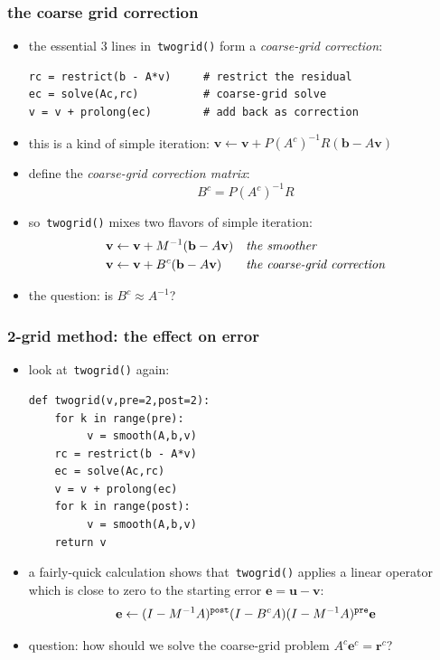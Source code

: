 \documentclass[10pt,
               svgnames,
               hyperref={colorlinks,citecolor=DeepPink4,linkcolor=FireBrick,urlcolor=Maroon},
               usepdftitle=false]{beamer}
\newcommand{\bb}{\mathbf{b}}
\newcommand{\be}{\mathbf{e}}
\newcommand{\br}{\mathbf{r}}
\newcommand{\bu}{\mathbf{u}}
\newcommand{\bv}{\mathbf{v}}
\begin{document}
\begin{frame}[fragile]
\frametitle{the coarse grid correction}
\begin{itemize}
\item the essential 3 lines in \,\texttt{twogrid()} form a \emph{coarse-grid correction}:

\medskip
\begin{verbatim}
rc = restrict(b - A*v)     # restrict the residual
ec = solve(Ac,rc)          # coarse-grid solve
v = v + prolong(ec)        # add back as correction
\end{verbatim}

\smallskip
\item this is a kind of simple iteration: \qquad $\bv \leftarrow \bv + P (A^c)^{-1} R (\bb - A\bv)$
\item define the \emph{coarse-grid correction matrix}:
	$$B^c = P (A^c)^{-1} R$$
\item so \,\texttt{twogrid()} mixes two flavors of simple iteration:
\begin{align*}
\bv &\leftarrow \bv + M^{-1} (\bb - A\bv) &&\text{\emph{the smoother}} \\
\bv &\leftarrow \bv + B^c (\bb - A\bv) &&\text{\emph{the coarse-grid correction}}
\end{align*}

\medskip
\item the question: is $B^c \approx A^{-1}$?  
\end{itemize}
\end{frame}


\begin{frame}[fragile]
\frametitle{2-grid method: the effect on error}
\begin{itemize}
\item look at \,\texttt{twogrid()} again:

\medskip
\begin{verbatim}
def twogrid(v,pre=2,post=2):
    for k in range(pre):
         v = smooth(A,b,v)
    rc = restrict(b - A*v)
    ec = solve(Ac,rc)
    v = v + prolong(ec)
    for k in range(post):
         v = smooth(A,b,v)
    return v
\end{verbatim}

\bigskip
\item a fairly-quick calculation shows that \,\texttt{twogrid()} applies a linear operator which is \alert{close to zero} to the starting error $\be=\bu-\bv$:
	$$\be \leftarrow (I - M^{-1} A)^{\text{\texttt{post}}} (I - B^c A) (I - M^{-1} A)^{\text{\texttt{pre}}} \be$$

\medskip
\item<2> question: how should we solve the coarse-grid problem $A^c \be^c = \br^c$?
\end{itemize}
\end{frame}
\end{document}
